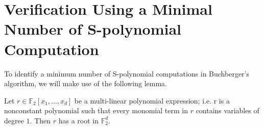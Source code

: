\section{Verification Using a Minimal Number of S-polynomial Computation}







To identify a minimum number of S-polynomial computations in
Buchberger's algorithm, we will make use of the following lemma. 
\begin{Lemma}\label{lem:root}
Let $r \in \mathbb{F}_2[x_1, \dots, x_d]$ be a multi-linear polynomial
expression; i.e. r is a nonconstant polynomial such that every
monomial term in $r$ contains variables of degree $1$. Then $r$ has a
root in $\mathbb{F}_2^d$. 
\end{Lemma}

